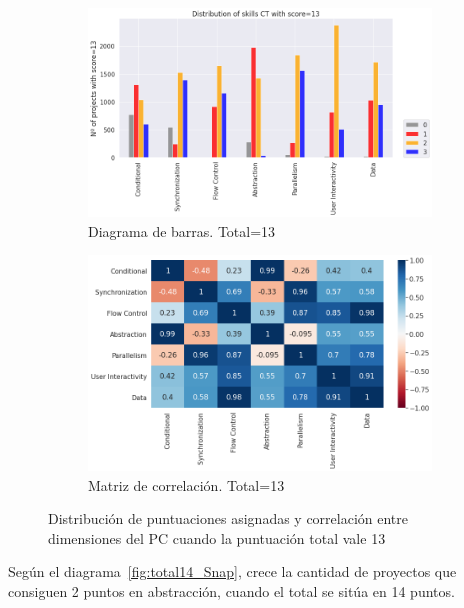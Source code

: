 \documentclass[a4paper, 12pt]{book}
\begin{document}
\begin{figure}[H]
    \centering
    \begin{subfigure}[h]{.49\textwidth} 
        \includegraphics[width=\textwidth]{img/distribucion_13_Snap}
        \caption{Diagrama de barras. Total=13}
        \label{fig:total13_Snap}
    \end{subfigure}       
    \begin{subfigure}[h]{.49\textwidth} 
        \includegraphics[width=\textwidth]{img/corr_13_Snap}
        \caption{Matriz de correlación. Total=13}
        \label{fig:corr13_Snap}
    \end{subfigure}
    \caption{Distribución de puntuaciones asignadas y correlación entre dimensiones del PC cuando la puntuación total vale 13}
\end{figure}

Según el diagrama~\ref{fig:total14_Snap}, crece la cantidad de proyectos que consiguen 2 puntos en abstracción, cuando el total se sitúa en 14 puntos.
\end{document}

